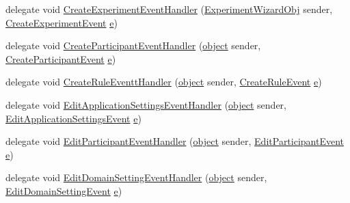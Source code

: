 \begin{DoxyCompactItemize}
\item 
delegate void \hyperlink{namespace_web_analyzer_1_1_events_a0d98385fddff10a46e47d4df06513bb1}{Create\+Experiment\+Event\+Handler} (\hyperlink{class_web_analyzer_1_1_u_i_1_1_interaction_objects_1_1_experiment_wizard_obj}{Experiment\+Wizard\+Obj} sender, \hyperlink{class_web_analyzer_1_1_events_1_1_create_experiment_event}{Create\+Experiment\+Event} \hyperlink{_u_i_2_h_t_m_l_resources_2js_2lib_2bootstrap_8min_8js_ab5902775854a8b8440bcd25e0fe1c120}{e})
\item 
delegate void \hyperlink{namespace_web_analyzer_1_1_events_a0c2cd67965a3ab4b60d116945f0c6490}{Create\+Participant\+Event\+Handler} (\hyperlink{_u_i_2_h_t_m_l_resources_2js_2lib_2underscore_8min_8js_aae18b7515bb2bc4137586506e7c0c903}{object} sender, \hyperlink{class_web_analyzer_1_1_events_1_1_create_participant_event}{Create\+Participant\+Event} \hyperlink{_u_i_2_h_t_m_l_resources_2js_2lib_2bootstrap_8min_8js_ab5902775854a8b8440bcd25e0fe1c120}{e})
\item 
delegate void \hyperlink{namespace_web_analyzer_1_1_events_a411dcf2260875859f1e6d4b3c3e3b46b}{Create\+Rule\+Eventt\+Handler} (\hyperlink{_u_i_2_h_t_m_l_resources_2js_2lib_2underscore_8min_8js_aae18b7515bb2bc4137586506e7c0c903}{object} sender, \hyperlink{class_web_analyzer_1_1_events_1_1_create_rule_event}{Create\+Rule\+Event} \hyperlink{_u_i_2_h_t_m_l_resources_2js_2lib_2bootstrap_8min_8js_ab5902775854a8b8440bcd25e0fe1c120}{e})
\item 
delegate void \hyperlink{namespace_web_analyzer_1_1_events_a5fea12ab57b4d49c98080dae8ae699a6}{Edit\+Application\+Settings\+Event\+Handler} (\hyperlink{_u_i_2_h_t_m_l_resources_2js_2lib_2underscore_8min_8js_aae18b7515bb2bc4137586506e7c0c903}{object} sender, \hyperlink{class_web_analyzer_1_1_events_1_1_edit_application_settings_event}{Edit\+Application\+Settings\+Event} \hyperlink{_u_i_2_h_t_m_l_resources_2js_2lib_2bootstrap_8min_8js_ab5902775854a8b8440bcd25e0fe1c120}{e})
\item 
delegate void \hyperlink{namespace_web_analyzer_1_1_events_a3259c67827e152226cea5a7ddbb8ce99}{Edit\+Participant\+Event\+Handler} (\hyperlink{_u_i_2_h_t_m_l_resources_2js_2lib_2underscore_8min_8js_aae18b7515bb2bc4137586506e7c0c903}{object} sender, \hyperlink{class_web_analyzer_1_1_events_1_1_edit_participant_event}{Edit\+Participant\+Event} \hyperlink{_u_i_2_h_t_m_l_resources_2js_2lib_2bootstrap_8min_8js_ab5902775854a8b8440bcd25e0fe1c120}{e})
\item 
delegate void \hyperlink{namespace_web_analyzer_1_1_events_a5fed3a7653709d0b4bd898915c660916}{Edit\+Domain\+Setting\+Event\+Handler} (\hyperlink{_u_i_2_h_t_m_l_resources_2js_2lib_2underscore_8min_8js_aae18b7515bb2bc4137586506e7c0c903}{object} sender, \hyperlink{class_web_analyzer_1_1_events_1_1_edit_domain_setting_event}{Edit\+Domain\+Setting\+Event} \hyperlink{_u_i_2_h_t_m_l_resources_2js_2lib_2bootstrap_8min_8js_ab5902775854a8b8440bcd25e0fe1c120}{e})

\end{DoxyCompactItemize}
